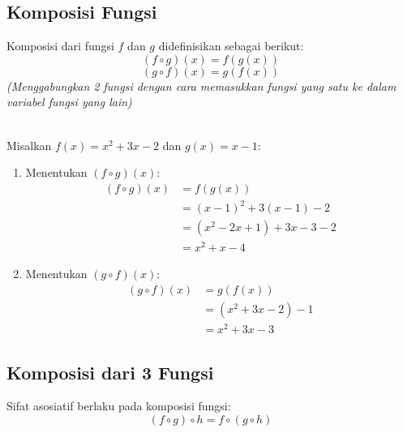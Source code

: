 \subsection{Komposisi Fungsi}
\begin{definition}
  Komposisi dari fungsi $f$ dan $g$ didefinisikan sebagai berikut:
  \[ (f \circ g)(x) = f(g(x)) \]
  \[ (g \circ f)(x) = g(f(x)) \]
  \textit{(Menggabungkan 2 fungsi dengan cara memasukkan fungsi yang satu ke dalam variabel fungsi yang lain)}
\end{definition}

\begin{example}
  \hfill \\
  Misalkan $f(x) = x^2 + 3x - 2$ dan $g(x) = x - 1$:
  \begin{enumerate}
  \item Menentukan $(f \circ g)(x)$:
    \[
    \begin{aligned}
      (f \circ g)(x) &= f(g(x)) \\
      &= (x - 1)^2 + 3(x - 1) - 2 \\
      &= (x^2 - 2x + 1) + 3x - 3 - 2 \\
      &= x^2 + x - 4
    \end{aligned}
    \]
  \item Menentukan $(g \circ f)(x)$:
    \[
    \begin{aligned}
      (g \circ f)(x) &= g(f(x)) \\
      &= (x^2 + 3x - 2) - 1 \\
      &= x^2 + 3x - 3
    \end{aligned}
    \]
  \end{enumerate}
\end{example}

\subsection{Komposisi dari 3 Fungsi}
\begin{definition}
  Sifat asosiatif berlaku pada komposisi fungsi:
  \[ (f \circ g) \circ h = f \circ (g \circ h) \]
\end{definition}

